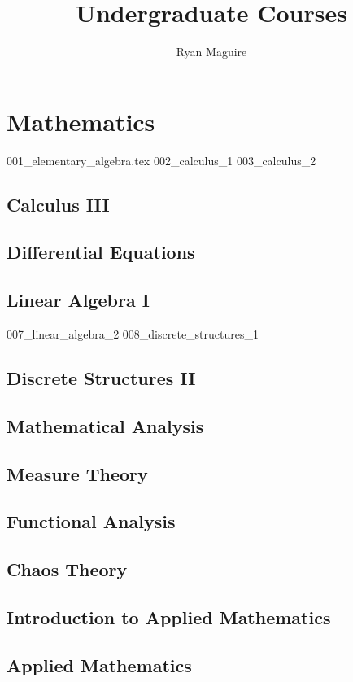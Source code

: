 \documentclass[crop=false,class=book,oneside]{standalone}
\title{Undergraduate Courses}
\author{Ryan Maguire}
\date{\vspace{-5ex}}
\begin{document}
\tableofcontents
\part{Mathematics}
{001_elementary_algebra.tex}
{002_calculus_1}
{003_calculus_2}
\chapter{Calculus III}
\chapter{Differential Equations}
\chapter{Linear Algebra I}
{007_linear_algebra_2}
{008_discrete_structures_1}
\chapter{Discrete Structures II}
\chapter{Mathematical Analysis}
\chapter{Measure Theory}
\chapter{Functional Analysis}
\chapter{Chaos Theory}
\chapter{Introduction to Applied Mathematics}
\chapter{Applied Mathematics}
\end{document}
